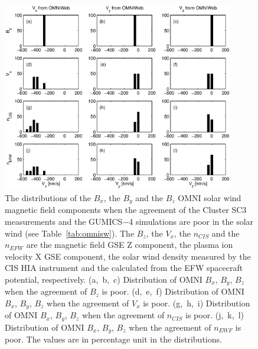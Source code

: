 \documentclass[linenumbers,draft]{agujournal}
\begin{document}
\pagebreak

\begin{figure}[h]
\centering
\includegraphics[width=0.9\textwidth,angle=0]{swe-2020-corr-f15.eps}  
\caption{The distributions of the $B_{x}$, the $B_{y}$  and the $B_{z}$ OMNI solar wind magnetic field components when the agreement of the Cluster SC3 measurements and the GUMICS$-$4 simulations are poor in the solar wind (see Table~\ref{tab:omnisw}). The $B_{z}$, the $V_{x}$, the $n_{CIS}$ and the $n_{EFW}$ are the magnetic field GSE Z component, the plasma ion velocity X GSE component, the  solar wind density measured by the CIS HIA instrument and the calculated from the EFW spacecraft potential, respectively. (a,~b,~c) Distribution of OMNI $B_{x}$, $B_{y}$, $B_{z}$ when the agreement of $B_{z}$ is poor. (d,~e,~f) Distribution of OMNI  $B_{x}$, $B_{y}$, $B_{z}$ when the agreement of $V_{x}$ is poor. (g,~h,~i) Distribution of OMNI $B_{x}$, $B_{y}$, $B_{z}$ when the agreement of $n_{CIS}$ is poor. (j,~k,~l) Distribution of OMNI $B_{x}$, $B_{y}$, $B_{z}$ when the agreement of $n_{EWF}$ is poor. The values are in percentage unit in the distributions.}
\label{fig:swomnibxyz}
\end{figure}

\pagebreak
\end{document}

